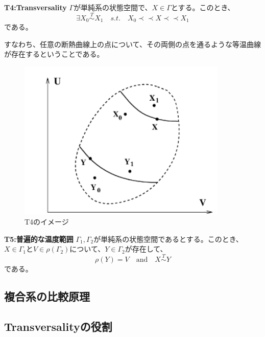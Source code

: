\documentclass[a4paper,11pt]{jsarticle}
\numberwithin{equation}{section}
\begin{document}
\begin{itembox}[l]{\textbf{T4:Transversality}}
    $\Gamma$が単純系の状態空間で、$X \in \Gamma$とする。このとき、
    \begin{equation}
    \exists X_0 \overset{T}{\sim} X_1 \quad s.t.\quad  X_0 \prec \prec X \prec \prec X_1
    \end{equation}
    である。
\end{itembox}
すなわち、任意の断熱曲線上の点について、その両側の点を通るような等温曲線が存在するということである。\\
\begin{figure}[H]
    \begin{center}
    \includegraphics[width=100mm]{fig6a.png}
    \end{center}
    \caption{T4のイメージ}
    \label{fig:four}
\end{figure}

\begin{itembox}[l]{\textbf{T5:普遍的な温度範囲}}
    $\Gamma_1,\Gamma_2$が単純系の状態空間であるとする。このとき、$X \in \Gamma_1$と$V \in \rho (\Gamma_2)$について、$Y \in \Gamma_2$が存在して、
    \begin{equation}
        \rho(Y) =V \quad \text{and} \quad X \overset{T}{\sim} Y
    \end{equation}
    である。
\end{itembox}

\subsection{複合系の比較原理}

\subsection{Transversalityの役割}
\end{document}
